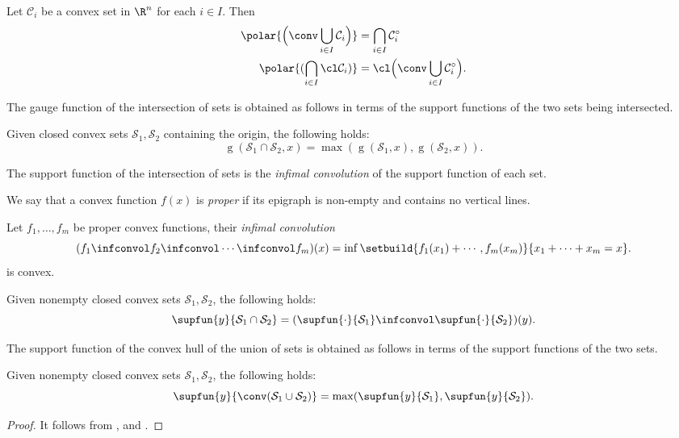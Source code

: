 \documentclass[11pt,twoside,a4paper,openright]{uclouvain-thesis}
\newcommand{\Cset}{\mathcal{C}}
\DeclareMathOperator{\gauge}{g}
\begin{document}
\begin{mylem}
  \label{lem:convcap}
  Let $\Cset_i$ be a convex set in $\R^n$ for each $i \in I$.
  Then
  \begin{align*}
    \polar{\Big(\conv \bigcup_{i \in I} \Cset_i\Big)} & = \bigcap_{i \in I} \Cset_i^\circ\\
    \polar{(\bigcap_{i \in I} \cl \Cset_i)} & = \cl \Big(\conv \bigcup_{i \in I} \Cset_i^\circ\Big).
  \end{align*}
\end{mylem}

The gauge function of the intersection of sets is obtained as follows in terms of the support functions of the two sets being intersected.
\begin{myprop}
  \label{prop:gaugeint}
  Given closed convex sets $\mathcal{S}_1, \mathcal{S}_2$ containing the origin,
  the following holds:
  \[
    \gauge(\mathcal{S}_1 \cap \mathcal{S}_2, x) = \max(\gauge(\mathcal{S}_1, x), \gauge(\mathcal{S}_2, x)).
  \]
\end{myprop}

The support function of the intersection of sets is
the \emph{infimal convolution} of the support function of each set.

\begin{mydef}
  We say that a convex function $f(x)$ is \emph{proper} if its epigraph
  is non-empty and contains no vertical lines.
\end{mydef}

\begin{myprop}
  Let $f_1, \ldots, f_m$ be proper convex functions,
  their \emph{infimal convolution}
  \[ (f_1 \infconvol f_2 \infconvol \cdots \infconvol f_m)(x) = \inf \setbuild{f_1(x_1) + \cdots, f_m(x_m)}{x_1 + \cdots + x_m = x}. \]
  is convex.
\end{myprop}

\begin{myprop}
  \label{prop:supportint}
  Given nonempty closed convex sets $\mathcal{S}_1, \mathcal{S}_2$,
  the following holds:
  \[
    \supfun{y}{\mathcal{S}_1 \cap \mathcal{S}_2} = (\supfun{\cdot}{\mathcal{S}_1} \infconvol \supfun{\cdot}{\mathcal{S}_2})(y).
  \]
\end{myprop}


The support function of the convex hull of the union of sets is obtained as follows in terms of the support functions of the two sets.
\begin{myprop}
  \label{prop:supportconv}
  Given nonempty closed convex sets $\mathcal{S}_1, \mathcal{S}_2$,
  the following holds:
  \[
    \supfun{y}{\conv(\mathcal{S}_1 \cup \mathcal{S}_2)} = \max(\supfun{y}{\mathcal{S}_1}, \supfun{y}{\mathcal{S}_2}).
  \]
  \begin{proof}
    It follows from ,  and .
  \end{proof}
\end{myprop}
\end{document}
